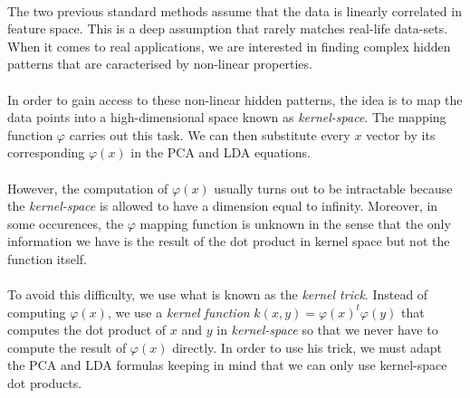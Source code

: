 \paragraph{}
The two previous standard methods assume that the data is linearly correlated in feature space. This
is a deep assumption that rarely matches real-life data-sets. When it comes to real applications, we
are interested in finding complex hidden patterns that are caracterised by non-linear properties.

\paragraph{}
In order to gain access to these non-linear hidden patterns, the idea is to map the data points into
a high-dimensional space known as \emph{kernel-space}. The mapping function $\varphi$ carries out
this task. We can then substitute every $x$ vector by its corresponding $\varphi(x)$ in the PCA and
LDA equations.

\paragraph{}
However, the computation of $\varphi(x)$ usually turns out to be intractable because the
\emph{kernel-space} is allowed to have a dimension equal to infinity. Moreover, in some occurences,
the $\varphi$ mapping function is unknown in the sense that the only information we have is the
result of the dot product in kernel space but not the function itself.

\paragraph{}
To avoid this difficulty, we use what is known as the \emph{kernel trick}. Instead of computing
$\varphi(x)$, we use a \emph{kernel function} $k(x, y) = \varphi(x)^t\varphi(y)$ that computes
the dot product of $x$ and $y$ in \emph{kernel-space} so that we never have to compute the result of
$\varphi(x)$ directly. In order to use his trick, we must adapt the PCA and LDA formulas keeping in
mind that we can only use kernel-space dot products.
